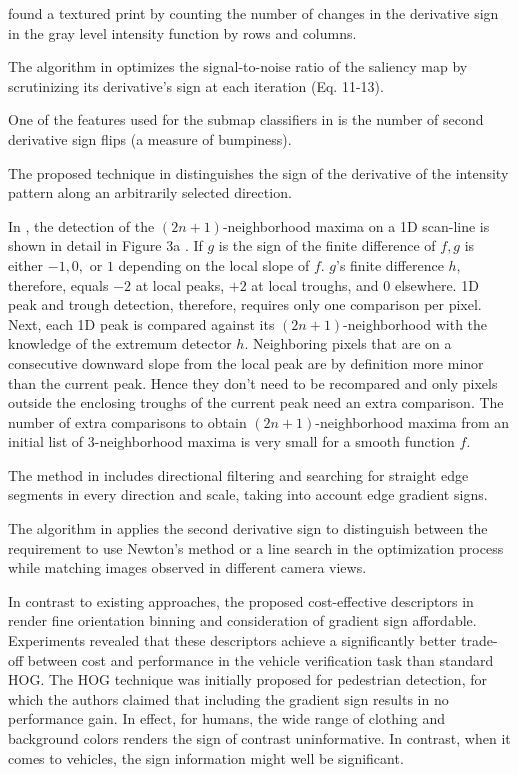 \documentclass[11pt]{book}
\begin{document}
\cite{grau2002texprint} found a textured print by counting the number
of changes in the derivative sign in the gray level intensity function
by rows and columns.

The algorithm in \cite{navalpakkam2006optimal} optimizes the signal-to-noise
ratio of the saliency map by scrutinizing its derivative's sign at
each iteration (Eq. 11-13).

One of the features used for the submap classifiers in \cite{brunskill2007topological}
is the number of second derivative sign flips (a measure of bumpiness).

The proposed technique in \cite{flores2010orientation} distinguishes
the sign of the derivative of the intensity pattern along an arbitrarily
selected direction.

In \cite{pham2010non}, the detection of the $\left(2n+1\right)$-neighborhood
maxima on a 1D scan-line is shown in detail in Figure 3a . If $g$
is the sign of the finite difference of $f,g$ is either $-1,0,$
or $1$ depending on the local slope of $f$. $g$'s finite difference
$h$, therefore, equals $-2$ at local peaks, $+2$ at local troughs,
and $0$ elsewhere. 1D peak and trough detection, therefore, requires
only one comparison per pixel. Next, each 1D peak is compared against
its $\left(2n+1\right)$-neighborhood with the knowledge of the extremum
detector $h$. Neighboring pixels that are on a consecutive downward
slope from the local peak are by definition more minor than the current
peak. Hence they don't need to be recompared and only pixels outside
the enclosing troughs of the current peak need an extra comparison.
The number of extra comparisons to obtain $\left(2n+1\right)$-neighborhood
maxima from an initial list of 3-neighborhood maxima is very small
for a smooth function $f$.

The method in \cite{volkov2011objects} includes directional filtering
and searching for straight edge segments in every direction and scale,
taking into account edge gradient signs.

The algorithm in \cite{li2013locally} applies the second derivative
sign to distinguish between the requirement to use Newton's method
or a line search in the optimization process while matching images
observed in different camera views.

In contrast to existing approaches, the proposed cost-effective descriptors
in \cite{arrospide2013image} render fine orientation binning and
consideration of gradient sign affordable. Experiments revealed that
these descriptors achieve a significantly better trade-off between
cost and performance in the vehicle verification task than standard
HOG. The HOG technique was initially proposed for pedestrian detection,
for which the authors claimed that including the gradient sign results
in no performance gain. In effect, for humans, the wide range of clothing
and background colors renders the sign of contrast uninformative.
In contrast, when it comes to vehicles, the sign information might
well be significant.
\end{document}
